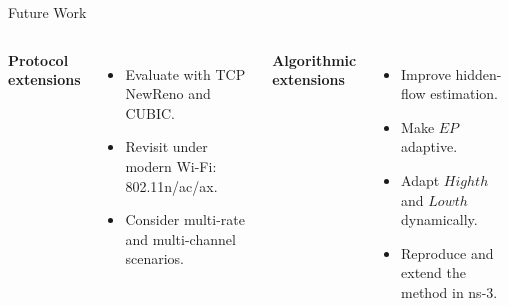 \begin{frame}{Future Work}

\begin{columns}[T,onlytextwidth]
\textbf{Protocol extensions}
\begin{itemize}
    \item Evaluate with TCP NewReno and CUBIC.
    \item Revisit under modern Wi-Fi: 802.11n/ac/ax.
    \item Consider multi-rate and multi-channel scenarios.
\end{itemize}

\textbf{Algorithmic extensions}
\begin{itemize}
    \item Improve hidden-flow estimation.
    \item Make $EP$ adaptive.
    \item Adapt $Highth$ and $Lowth$ dynamically.
    \item Reproduce and extend the method in ns-3.
\end{itemize}
\end{columns}
\end{frame}
